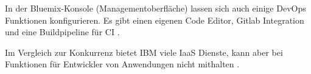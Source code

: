 In der Bluemix-Konsole (Managementoberfläche) lassen sich auch einige \gls{DevOps} Funktionen konfigurieren. Es gibt einen eigenen Code Editor, Gitlab Integration und eine Buildpipeline für \ac{CI} \parencite{fassnacht.2016}.

Im Vergleich zur Konkurrenz bietet IBM viele \acs{IaaS} Dienste, kann aber bei Funktionen für Entwickler von Anwendungen nicht mithalten \parencite{computerwoche.2016}. 

